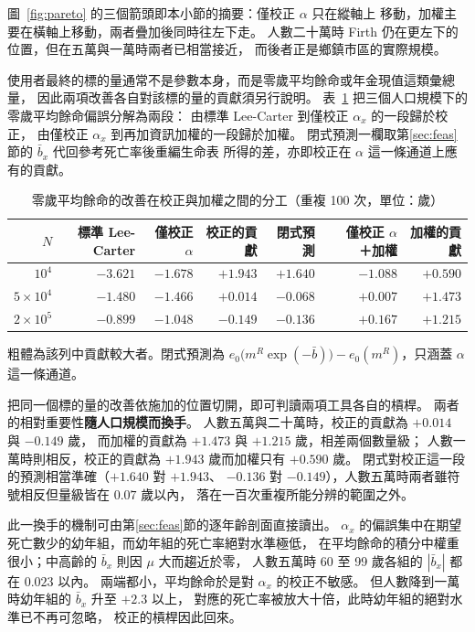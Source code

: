 \documentclass[UTF8, fontset=macnew, a4paper, 12pt]{ctexart}
\begin{document}
圖~\ref{fig:pareto} 的三個箭頭即本小節的摘要：僅校正 $\alpha$ 只在縱軸上
移動，加權主要在橫軸上移動，兩者疊加後同時往左下走。
人數二十萬時 Firth 仍在更左下的位置，但在五萬與一萬時兩者已相當接近，
而後者正是鄉鎮市區的實際規模。


使用者最終的標的量通常不是參數本身，而是零歲平均餘命或年金現值這類彙總量，
因此兩項改善各自對該標的量的貢獻須另行說明。
表~\ref{tab:split} 把三個人口規模下的零歲平均餘命偏誤分解為兩段：
由標準 Lee-Carter 到僅校正 $\alpha_x$ 的一段歸於校正，
由僅校正 $\alpha_x$ 到再加資訊加權的一段歸於加權。
閉式預測一欄取第\ref{sec:feas}節的 $\bar b_x$ 代回參考死亡率後重編生命表
所得的差，亦即校正在 $\alpha$ 這一條通道上應有的貢獻。

\begin{table}[H]
\centering
\caption{零歲平均餘命的改善在校正與加權之間的分工（重複 100 次，單位：歲）}
\footnotesize
\begin{tabular}{rrrrrrr}
\toprule
$N$ & 標準 Lee-Carter & 僅校正 $\alpha$ & 校正的貢獻 & 閉式預測
 & \ 僅校正 $\alpha$ ＋加權 & 加權的貢獻\\
\midrule
$10^{4}$          & $-3.621$ & $-1.678$ & $\mathbf{+1.943}$ & $+1.640$ & $-1.088$ & $+0.590$\\
$5\times10^{4}$   & $-1.480$ & $-1.466$ & $+0.014$ & $-0.068$ & $+0.007$ & $\mathbf{+1.473}$\\
$2\times10^{5}$   & $-0.899$ & $-1.048$ & $-0.149$ & $-0.136$ & $+0.167$ & $\mathbf{+1.215}$\\
\bottomrule
\end{tabular}

\vspace{3pt}
{\footnotesize 粗體為該列中貢獻較大者。閉式預測為
$e_0\bigl(m^{R}\exp(-\bar b)\bigr)-e_0(m^{R})$，只涵蓋 $\alpha$ 這一條通道。}
\label{tab:split}
\end{table}

把同一個標的量的改善依施加的位置切開，即可判讀兩項工具各自的槓桿。
兩者的相對重要性\textbf{隨人口規模而換手}。
人數五萬與二十萬時，校正的貢獻為 $+0.014$ 與 $-0.149$ 歲，
而加權的貢獻為 $+1.473$ 與 $+1.215$ 歲，相差兩個數量級；
人數一萬時則相反，校正的貢獻為 $+1.943$ 歲而加權只有 $+0.590$ 歲。
閉式對校正這一段的預測相當準確（$+1.640$ 對 $+1.943$、
$-0.136$ 對 $-0.149$），人數五萬時兩者雖符號相反但量級皆在 $0.07$ 歲以內，
落在一百次重複所能分辨的範圍之外。

此一換手的機制可由第\ref{sec:feas}節的逐年齡剖面直接讀出。
$\alpha_x$ 的偏誤集中在期望死亡數少的幼年組，而幼年組的死亡率絕對水準極低，
在平均餘命的積分中權重很小；中高齡的 $\bar b_x$ 則因 $\mu$ 大而趨近於零，
人數五萬時 60 至 99 歲各組的 $|\bar b_x|$ 都在 $0.023$ 以內。
兩端都小，平均餘命於是對 $\alpha_x$ 的校正不敏感。
但人數降到一萬時幼年組的 $\bar b_x$ 升至 $+2.3$ 以上，
對應的死亡率被放大十倍，此時幼年組的絕對水準已不再可忽略，
校正的槓桿因此回來。
\end{document}
